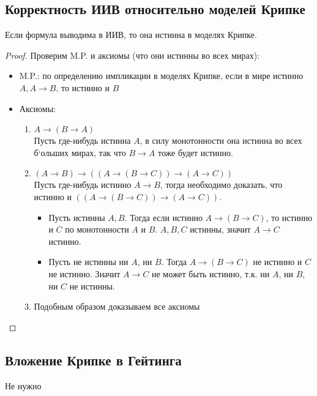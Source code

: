 \subsection{Корректность ИИВ относительно моделей Крипке}
\label{sec-6-2}
\begin{theorem}
Если формула выводима в ИИВ, то она истинна в моделях Крипке.
\end{theorem}
\begin{proof}
Проверим M.P. и аксиомы (что они истинны во всех мирах):
\begin{itemize}
\item M.P.: по определению импликации в моделях Крипке, если в мире истинно $A, A \rightarrow B$, то истинно и $B$
\item Аксиомы:
\begin{enumerate}
\item $A \rightarrow (B \rightarrow A)$\\
Пусть где-нибудь истинна $A$, в силу монотонности она истинна во всех б`ольших мирах, так что $B \rightarrow A$ тоже будет истинно.
\item $(A \rightarrow B) \rightarrow ((A \rightarrow (B \rightarrow C)) \rightarrow (A \rightarrow C))$\\
Пусть где-нибудь истинно $A \rightarrow B$, тогда необходимо доказать, что истинно и $((A \rightarrow (B \rightarrow C)) \rightarrow (A \rightarrow C))$.
\begin{itemize}
\item Пусть истинны $A, B$. Тогда если истинно $A \rightarrow (B \rightarrow C)$, то истинно и $C$ по монотонности $A$ и $B$. $A, B, C$ истинны, значит $A \rightarrow C$ истинно.
\item Пусть не истинны ни $A$, ни $B$. Тогда $A \rightarrow (B \rightarrow C)$ не истинно и $C$ не истинно. Значит $A \rightarrow C$ не может быть истинно, т.к. ни $A$, ни $B$, ни $C$ не истинны. 
\end{itemize}
\item Подобным образом доказываем все аксиомы
\end{enumerate}
\end{itemize}
\end{proof}
\subsection{Вложение Крипке в Гейтинга}
\label{sec-6-3}
Не нужно
